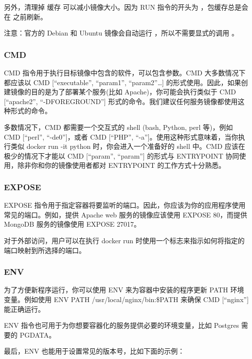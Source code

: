 \documentclass[letterpaper,10pt,english]{sphinxmanual}
\begin{document}
另外，清理掉  缓存 可以减小镜像大小。因为 RUN 指令的开头为 ，包缓存总是会在  之前刷新。

注意：官方的 Debian 和 Ubuntu 镜像会自动运行 ，所以不需要显式的调用 。


\subsubsection{CMD}
\label{\detokenize{docker/appendix:cmd}}
CMD 指令用于执行目标镜像中包含的软件，可以包含参数。CMD 大多数情况下都应该以 CMD {[}“executable”, “param1”, “param2”…{]} 的形式使用。因此，如果创建镜像的目的是为了部署某个服务(比如 Apache)，你可能会执行类似于 CMD {[}“apache2”, “-DFOREGROUND”{]} 形式的命令。我们建议任何服务镜像都使用这种形式的命令。

多数情况下，CMD 都需要一个交互式的 shell (bash, Python, perl 等)，例如 CMD {[}“perl”, “-de0”{]}，或者 CMD {[}“PHP”, “-a”{]}。使用这种形式意味着，当你执行类似 docker run -it python 时，你会进入一个准备好的 shell 中。CMD 应该在极少的情况下才能以 CMD {[}“param”, “param”{]} 的形式与 ENTRYPOINT 协同使用，除非你和你的镜像使用者都对 ENTRYPOINT 的工作方式十分熟悉。


\subsubsection{EXPOSE}
\label{\detokenize{docker/appendix:expose}}
EXPOSE 指令用于指定容器将要监听的端口。因此，你应该为你的应用程序使用常见的端口。例如，提供 Apache web 服务的镜像应该使用 EXPOSE 80，而提供 MongoDB 服务的镜像使用 EXPOSE 27017。

对于外部访问，用户可以在执行 docker run 时使用一个标志来指示如何将指定的端口映射到所选择的端口。


\subsubsection{ENV}
\label{\detokenize{docker/appendix:env}}
为了方便新程序运行，你可以使用 ENV 来为容器中安装的程序更新 PATH 环境变量。例如使用 ENV PATH /usr/local/nginx/bin:\$PATH 来确保 CMD {[}“nginx”{]} 能正确运行。

ENV 指令也可用于为你想要容器化的服务提供必要的环境变量，比如 Postgres 需要的 PGDATA。

最后，ENV 也能用于设置常见的版本号，比如下面的示例：
\end{document}

